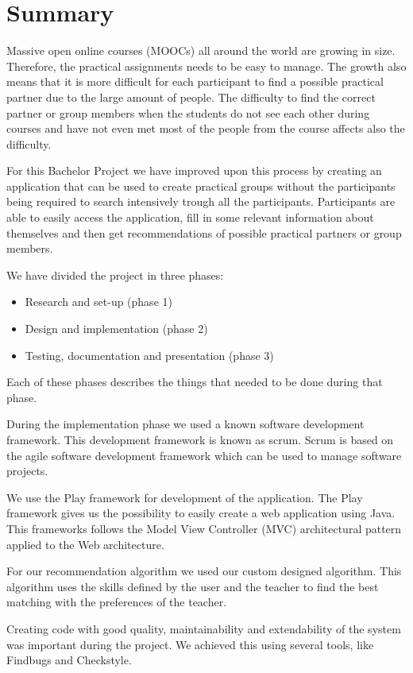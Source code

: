 \chapter*{Summary}

Massive open online courses (MOOCs) all around the world are growing in size. 
Therefore, the practical assignments needs to be easy to manage.
The growth also means that it is more difficult for each participant to find a possible practical partner due to the large amount of people.
The difficulty to find the correct partner or group members when the students do not see each other during courses and have not even met most of the people from the course affects also the difficulty.

For this Bachelor Project we have improved upon this process by creating an application that can be used to create practical groups without the participants being required to search intensively trough all the participants.
Participants are able to easily access the application, fill in some relevant information about themselves and then get recommendations of possible practical partners or group members.

We have divided the project in three phases:
\begin{itemize}
\item Research and set-up (phase 1)
\item Design and implementation (phase 2)
\item Testing, documentation and presentation (phase 3)
\end{itemize}
Each of these phases describes the things that needed to be done during that phase.

During the implementation phase we used a known software development framework.
This development framework is known as scrum.
Scrum is based on the agile software development framework which can be used to 
manage software projects.

We use the Play framework for development of the application. 
The Play framework gives us the possibility to easily create a web application using Java.
This frameworks follows the Model View Controller (MVC) architectural pattern applied to the Web architecture.

For our recommendation algorithm we used our custom designed algorithm.
This algorithm uses the skills defined by the user and the teacher to find the best matching with the preferences of the teacher.

Creating code with good quality, maintainability and extendability of the system was important during the project.
We achieved this using several tools, like Findbugs and Checkstyle.

